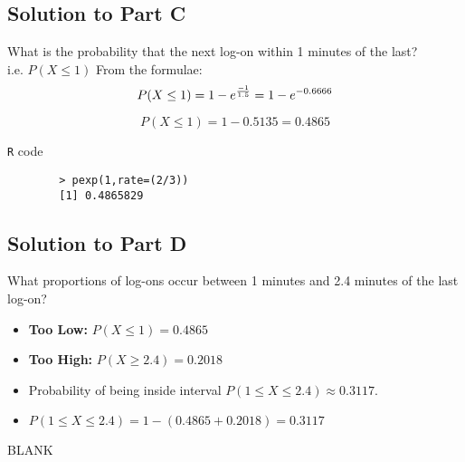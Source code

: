 \documentclass[a4paper,12pt]{article}
\begin{document}
	\newpage 
	\subsection*{Solution to Part C }
	
	
	
	What is the probability that the next log-on within 1 minutes of the last?\\
	i.e. $P(X \leq 1)$
	\bigskip
	From the formulae:
	\[
	P( X \leq 1) = 1 - e^{{-1 \over 1.5}} = 1 -  e^{-0.6666}
	\]
	
	\[
	P( X \leq 1) = 1 -  0.5135  = 0.4865
	\]
	\begin{framed}
		\medskip
		\noindent \texttt{R} code 
		
		\begin{verbatim}
		> pexp(1,rate=(2/3))
		[1] 0.4865829
		\end{verbatim}
	\end{framed}
	
	\newpage 
	\subsection*{Solution to Part D}
	
	
	
	What proportions of log-ons occur between 1 minutes and 2.4 minutes of the last log-on?
	
	\begin{itemize}
		\item \textbf{Too Low:} $P(X \leq 1) = 0.4865$
		\item \textbf{Too High:} $P(X \geq 2.4) = 0.2018$
		\item Probability of being inside interval $P(1 \leq X \leq 2.4) \approx 0.3117$.
		\item $P(1 \leq X \leq 2.4) = 1- ( 0.4865 + 0.2018) = 0.3117$
	\end{itemize}
	
	\newpage
	BLANK
	
	
\end{document}
